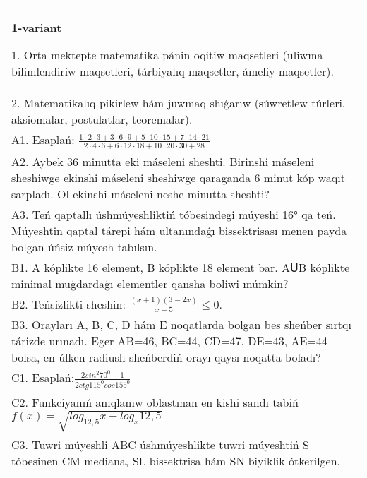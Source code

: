 \documentclass{article}
\begin{document}


\begin{tabular}{m{17cm}}
\textbf{1-variant}

1. Orta mektepte matematika pánin oqitiw maqsetleri (uliwma bilimlendiriw maqsetleri, tárbiyalıq maqsetler, ámeliy maqsetler). \\
2. Matematikalıq pikirlew hám juwmaq shıǵarıw (súwretlew túrleri, aksiomalar, postulatlar, teoremalar). \\
A1. Esaplań: \(\frac{1 \cdot 2 \cdot 3 + 3 \cdot 6 \cdot 9 + 5 \cdot 10 \cdot 15 + 7 \cdot 14 \cdot 21}{2 \cdot 4 \cdot 6 + 6 \cdot 12 \cdot 18 + 10 \cdot 20 \cdot 30 + 28}\) \\
A2. Aybek 36 minutta eki máseleni sheshti. Birinshi máseleni sheshiwge ekinshi máseleni sheshiwge qaraganda 6 minut kóp waqıt sarpladı. Ol ekinshi máseleni neshe minutta sheshti? \\
A3. Teń qaptallı úshmúyeshliktiń tóbesindegi múyeshi 16° qa teń. Múyeshtin qaptal tárepi hám ultanındaǵı bissektrisası menen payda bolgan úńsiz múyesh tabılsın. \\
B1. A kóplikte 16 element, B kóplikte 18 element bar. AՍB kóplikte minimal muģdardaģı elementler qansha boliwi múmkin? \\
B2. Teńsizlikti sheshin: \(\frac{ (x + 1) (3 - 2x) }{x - 5} \leq 0\). \\
B3. Orayları A, B, C, D hám E noqatlarda bolgan bes sheńber sırtqı tárizde urınadı. Eger AB=46, BC=44, CD=47, DE=43, AE=44 bolsa, en úlken radiuslı sheńberdiń orayı qaysı noqatta boladı? \\
C1. Esaplań:\(\frac{2sin^{2}70^{0} - 1}{2ctg115^{0}cos155^{0}}\) \\
C2. Funkciyanıń anıqlanıw oblastınan en kishi sandı tabiń \(f (x) = \sqrt{log_{12,5}x - log_{x}12,5}\) \\
C3. Tuwri múyeshli ABC úshmúyeshlikte tuwri múyeshtiń S tóbesinen CM mediana, SL bissektrisa hám SN biyiklik ótkerilgen. \\

\end{tabular}
\vspace{1cm}
\end{document}
